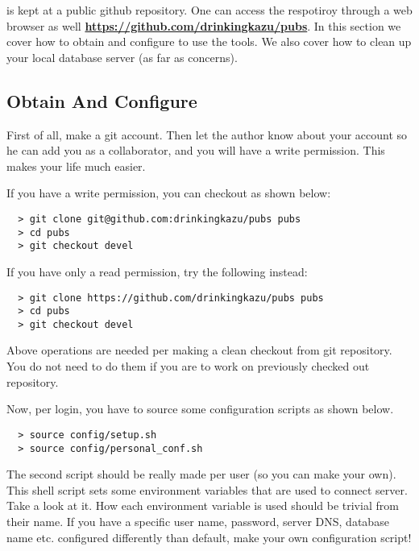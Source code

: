 
{\pubs} is kept at a public github repository. One can access the respotiroy
through a web browser as well
\href{https://github.com/drinkingkazu/pubs}{\color{blue}\bf https://github.com/drinkingkazu/pubs}.
In this section we cover how to obtain {\pubs} and configure to use the tools.
We also cover how to clean up your local database server (as far as {\pubs} concerns).

\subsection{Obtain And Configure {\pubs}}
\label{prep:pubs:conf}
First of all, make a git account. Then let the author know about your account so he
can add you as a collaborator, and you will have a write permission. This makes your
life much easier.

If you have a write permission, you can checkout as shown below:
\begin{lstlisting}
  > git clone git@github.com:drinkingkazu/pubs pubs
  > cd pubs
  > git checkout devel
\end{lstlisting}
If you have only a read permission, try the following instead:
\begin{lstlisting}
  > git clone https://github.com/drinkingkazu/pubs pubs
  > cd pubs
  > git checkout devel
\end{lstlisting}
Above operations are needed per making a clean checkout from git repository.
You do not need to do them if you are to work on previously checked out repository.

Now, per login, you have to source some configuration scripts as shown below.
\begin{lstlisting}
  > source config/setup.sh
  > source config/personal_conf.sh
\end{lstlisting}
The second script should be really made per user (so you can make your own).
This shell script sets some environment variables that are used to connect
{\psql} server. Take a look at it. How each environment variable is used 
should be trivial from their name. If you have a specific user name, password,
server DNS, database name etc. configured differently than default, make
your own configuration script!

